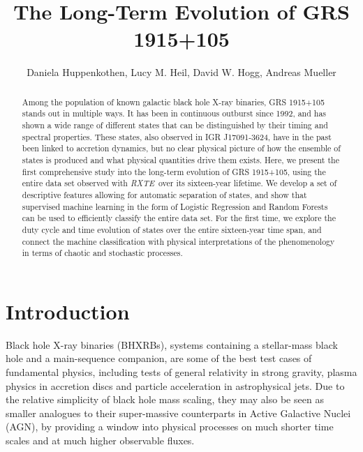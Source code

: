 \documentclass[12pt]{emulateapj}
\newcommand{\project}[1]{\textsl{#1}}
\newcommand{\rxte}{\project{RXTE}}
\begin{document}
\title{The Long-Term Evolution of GRS 1915+105}

\author{Daniela Huppenkothen, Lucy M. Heil, David W. Hogg, Andreas Mueller}
 
  

\begin{abstract}
Among the population of known galactic black hole X-ray binaries, GRS 1915+105 stands out in multiple ways. It has been in continuous outburst since 1992, and has shown a wide range of different states that can be distinguished by their timing and spectral properties. These states, also observed in IGR J17091-3624, have in the past been linked to accretion dynamics, but no clear physical picture of how the ensemble of states is produced and what physical quantities drive them exists. Here, we present the first comprehensive study into the long-term evolution of GRS 1915+105, using the entire data set observed with \rxte\ over its sixteen-year lifetime. We develop a set of descriptive features allowing for automatic separation of states, and show that supervised machine learning in the form of Logistic Regression and Random Forests can be used to efficiently classify the entire data set. For the first time, we explore the duty cycle and time evolution of states over the entire sixteen-year time span, and connect the machine classification with physical interpretations of the phenomenology in terms of chaotic and stochastic processes.
\end{abstract}


\section{Introduction}

Black hole X-ray binaries (BHXRBs), systems containing a stellar-mass black hole and a main-sequence companion, are some of the best test cases of fundamental physics, including tests of general relativity in strong gravity, plasma physics in accretion discs and particle acceleration in astrophysical jets. 
Due to the relative simplicity of black hole mass scaling, they may also be seen as smaller analogues to their super-massive counterparts in Active Galactive Nuclei (AGN), by providing a window into physical processes on much shorter time scales and at much higher observable fluxes.
\end{document}
